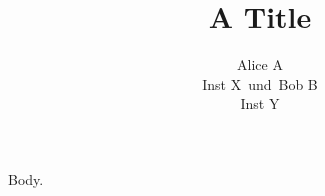 \documentclass{article}
\def\and{\unskip\ und\ \ignorespaces}
\begin{document}
\title{A Title}
\author{Alice A\\Inst X\and Bob B\\Inst Y}
\maketitle
Body.
\end{document}
